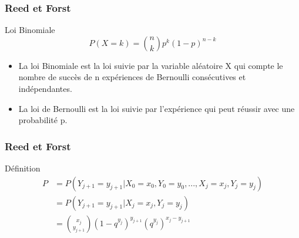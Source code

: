 \begin{frame}
    \frametitle{Reed et Forst}

    \begin{alertblock}{Loi Binomiale}
        $$ P(X = k) = \binom{n}{k}p^k(1 - p)^{n-k} $$
    \end{alertblock}

    \begin{itemize}
        \item La loi Binomiale est la loi suivie par la variable aléatoire X qui compte le nombre de succès de n expériences de Bernoulli consécutives et indépendantes.
        \item La loi de Bernoulli est la loi suivie par l'expérience qui peut réussir avec une probabilité p.
    \end{itemize}
\end{frame}

\begin{frame}
    \frametitle{Reed et Forst}

    \begin{alertblock}{Définition}
        \begin{align}
            P &= P(Y_{j+1} = y_{j+1} | X_0 = x_0, Y_0 = y_0, ..., X_j = x_j, Y_j = y_j) \\
              &= P(Y_{j+1} = y_{j+1} | X_j = x_j, Y_j = y_j) \\
              &= \binom{x_j}{y_{j+1}}(1 - q^{y_j})^{y_{j+1}}(q^{y_j})^{x_j - y_{j+1}}
        \end{align}
    \end{alertblock}
\end{frame}
